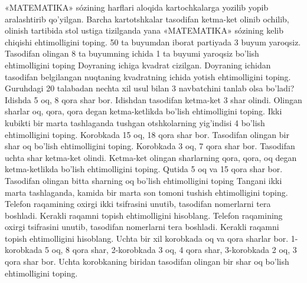 «MATEMATIKA» sózining harflari aloqida kartochkalarga yozilib yopib aralashtirib qo'yilgan. Barcha kartotshkalar tasodifan ketma-ket olinib ochilib, olinish tartibida stol ustiga tizilganda yana «MATEMATIKA» sózining kelib chiqishi ehtimolligini toping.
50 ta buyumdan iborat partiyada 3 buyum yaroqsiz. Tasodifan olingan 8 ta buyumning ichida 1 ta buyumi yaroqsiz bo'lish ehtimolligini toping
Doyraning ichiga kvadrat cizilgan. Doyraning ichidan tasodifan belgilangan nuqtaning kvadratning ichida yotish ehtimolligini toping.
Guruhdagi 20 talabadan nechta xil usul bilan 3 navbatchini tanlab olsa bo'ladi?
Idishda 5 oq, 8 qora shar bor. Idishdan tasodifan ketma-ket 3 shar olindi. Olingan sharlar oq, qora, qora degan ketma-ketlikda bo'lish ehtimolligini toping.
Ikki kubikti bir marta tashlaganda tushgan otshkolarning yig'indisi 4 bo'lish ehtimolligini toping.
Korobkada 15 oq, 18 qora shar bor. Tasodifan olingan bir shar oq bo'lish ehtimolligini toping.
Korobkada 3 oq, 7 qora shar bor. Tasodifan uchta shar ketma-ket olindi. Ketma-ket olingan sharlarning qora, qora, oq degan ketma-ketlikda bo'lish ehtimolligini toping.
Qutida 5 oq va 15 qora shar bor. Tasodifan olingan bitta sharning oq bo'lish ehtimolligini toping
Tangani ikki marta tashlaganda, kamida bir marta son tomoni tushish ehtimolligini toping.
Telefon raqamining oxirgi ikki tsifrasini unutib, tasodifan nomerlarni tera boshladi. Kerakli raqamni topish ehtimolligini hisoblang.
Telefon raqamining oxirgi tsifrasini unutib, tasodifan nomerlarni tera boshladi. Kerakli raqamni topish ehtimolligini hisoblang.
Uchta bir xil korobkada oq va qora sharlar bor. 1-korobkada 5 oq, 8 qora shar, 2-korobkada 3 oq, 4 qora shar, 3-korobkada 2 oq, 3 qora shar bor. Uchta korobkaning biridan tasodifan olingan bir shar oq bo'lish ehtimolligini toping.